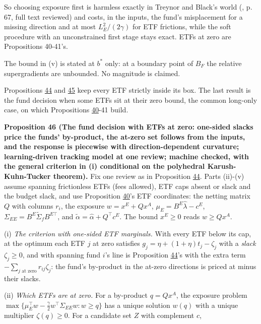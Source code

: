 \documentclass[11pt]{article}
\begin{document}
So choosing exposure first is harmless exactly in Treynor and Black's
world (\cite{treynor1973security}, p. 67, full text reviewed) and costs, in
the inputs, the fund's misplacement for a missing direction and at
most \(L_E^2/(2\gamma)\) for ETF frictions, while the soft procedure with an
unconstrained first stage stays exact. ETFs at zero are Propositions
40-41's.

The bound in (v) is stated at \(b^*\) only: at a boundary point of \(B_F\) the
relative supergradients are unbounded. No magnitude is claimed.

Propositions \hyperref[res:Proposition-44]{44} and \hyperref[res:Proposition-45]{45} keep every ETF strictly inside its box. The
last result is the fund decision when some ETFs sit at their zero
bound, the common long-only case, on which Propositions \hyperref[res:Proposition-40]{40}-41 build.

\label{res:Proposition-46}
\textbf{Proposition 46 (The fund decision with ETFs at zero: one-sided slacks price the funds' by-product, the at-zero set follows from the inputs, and the response is piecewise with direction-dependent curvature; learning-driven tracking model at one review; machine checked, with the general criterion in (i) conditional on the polyhedral Karush-Kuhn-Tucker theorem).}
Fix one review as in Proposition \hyperref[res:Proposition-44]{44}. Parts (ii)-(v) assume spanning
frictionless ETFs (fees allowed), ETF caps absent or slack and the
budget slack, and use Proposition \hyperref[res:Proposition-40]{40}'s ETF coordinates: the netting
matrix \(Q\) with columns \(r_i\), the exposure \(w=x^E+Qx^A\), \(\mu_E=B^E\hat\lambda-c^E\),
\(\Sigma_{EE}=B^E\tilde\Sigma_fB^{E\top}\), and \(\tilde\alpha=\hat\alpha+Q^\top c^E\). The bound \(x^E\geq0\) reads \(w\geq Qx^A\).

(i) \emph{The criterion with one-sided ETF marginals.} With every ETF below
its cap, at the optimum each ETF \(j\) at zero satisfies
\(g_j=\eta+(1+\eta)t_j-\zeta_j\) with a \emph{slack} \(\zeta_j\geq0\), and with spanning fund
\(i\)'s line is Proposition \hyperref[res:Proposition-44]{44}'s with the extra term \(-\sum_{j\text{ at zero}}r_{ij}\zeta_j\): the
fund's by-product in the at-zero directions is priced at minus their
slacks.

(ii) \emph{Which ETFs are at zero.} For a by-product \(q=Qx^A\), the exposure
problem \(\max\{\mu_E^\top w-\frac\gamma2w^\top\Sigma_{EE}w:w\geq q\}\) has a unique solution \(w(q)\)
with a unique multiplier \(\zeta(q)\geq0\). For a candidate set \(Z\) with
complement \(c\),
\end{document}
